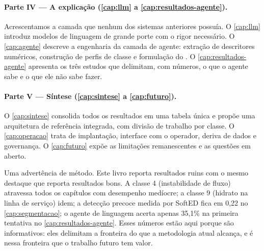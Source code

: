 \paragraph{Parte IV --- A explicação (\cref{cap:llm} a \cref{cap:resultados-agente}).}
Acrescentamos a camada que nenhum dos sistemas anteriores possuía. O \cref{cap:llm}
introduz modelos de linguagem de grande porte com o rigor necessário. O
\cref{cap:agente} descreve a engenharia da camada de agente: extração de descritores
numéricos, construção de perfis de classe e formulação do . O
\cref{cap:resultados-agente} apresenta os três estudos que delimitam, com números, o
que o agente sabe e o que ele não sabe fazer.

\paragraph{Parte V --- Síntese (\cref{cap:sintese} a \cref{cap:futuro}).}
O \cref{cap:sintese} consolida todos os resultados em uma tabela única e propõe uma
arquitetura de referência integrada, com divisão de trabalho por classe. O
\cref{cap:operacao} trata de implantação, interface com o operador, deriva de dados e
governança. O \cref{cap:futuro} expõe as limitações remanescentes e as questões em
aberto.

\begin{destaque}
Uma advertência de método. Este livro reporta resultados ruins com o mesmo destaque
que reporta resultados bons. A classe 4 (instabilidade de fluxo) atravessa todos os
capítulos com desempenho medíocre; a classe 9 (hidrato na linha de serviço) idem; a
detecção precoce medida por SoftED fica em 0,22 no \cref{cap:segmentacao}; o agente de
linguagem acerta apenas 35,1\% na primeira tentativa no \cref{cap:resultados-agente}.
Esses números estão aqui porque são informativos: eles delimitam a fronteira do que a
metodologia atual alcança, e é nessa fronteira que o trabalho futuro tem valor.
\end{destaque}


